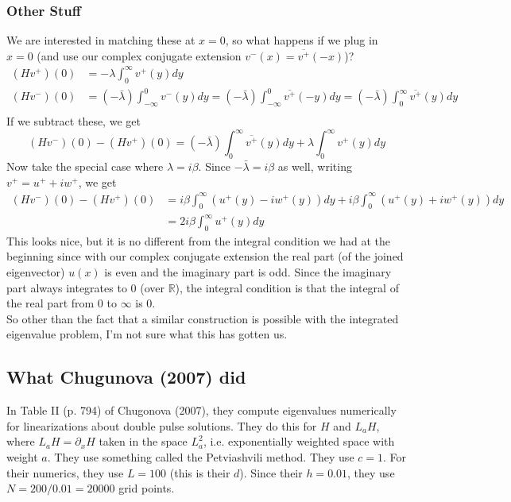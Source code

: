 \documentclass[12pt]{article}
\def\R{{\mathbb R}}
\begin{document}
\subsubsection*{Other Stuff}
We are interested in matching these at $x = 0$, so what happens if we plug in $x = 0$ (and use our complex conjugate extension $v^-(x) = \overline{v^+}(-x)$)?
\begin{align*}
(Hv^+)(0) &= -\lambda \int_0^\infty v^+(y) dy \\
(Hv^-)(0) &= (-\bar{\lambda}) \int_{-\infty}^0 v^-(y)dy = (-\bar{\lambda}) \int_{-\infty}^0 \overline{v^+}(-y)dy = (-\bar{\lambda}) \int_0^\infty \overline{v^+}(y)dy\\
\end{align*}
If we subtract these, we get
\[
(Hv^-)(0) - (Hv^+)(0) = (-\bar{\lambda}) \int_0^\infty \overline{v^+}(y)dy + \lambda \int_0^\infty v^+(y) dy
\]
Now take the special case where $\lambda = i \beta$. Since $-\bar{\lambda} = i \beta$ as well, writing $v^+ = u^+ + i w^+$, we get
\begin{align*}
(Hv^-)(0) - (Hv^+)(0) &= i \beta \int_0^\infty (u^+(y) - i w^+(y))dy + i \beta \int_0^\infty (u^+(y) + i w^+(y)) dy \\
&= 2 i \beta \int_0^\infty u^+(y) dy
\end{align*}
This looks nice, but it is no different from the integral condition we had at the beginning since with our complex conjugate extension the real part (of the joined eigenvector) $u(x)$ is even and the imaginary part is odd. Since the imaginary part always integrates to 0 (over $\R$), the integral condition is that the integral of the real part from 0 to $\infty$ is 0.\\

So other than the fact that a similar construction is possible with the integrated eigenvalue problem, I'm not sure what this has gotten us.

\subsection*{What Chugunova (2007) did}
In Table II (p. 794) of Chugonova (2007), they compute eigenvalues numerically for linearizations about double pulse solutions. They do this for $H$ and $L_aH$, where $L_aH = \partial_x H$ taken in the space $L^2_a$, i.e. exponentially weighted space with weight $a$. They use something called the Petviashvili method. They use $c = 1$. For their numerics, they use $L = 100$ (this is their $d$). Since their $h = 0.01$, they use $N = 200 / 0.01 = 20000$ grid points. \\
\end{document}
